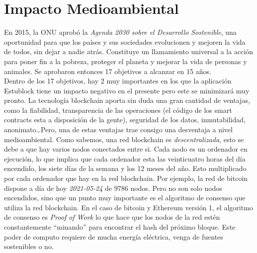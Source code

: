 \chapter{Impacto Medioambiental}
\label{cap:ImpactoMedioAmbiente}

En 2015, la ONU aprobó la \emph{Agenda 2030 sobre el Desarrollo Sostenible}\cite{agenda2030}, una oportunidad para que los países y sus sociedades evolucionen y mejoren la vida de todos, sin dejar a nadie atrás. Constituye un llamamiento universal a la acción para poner fin a la pobreza, proteger el planeta y mejorar la vida de personas y animales. Se aprobaron entonces 17 objetivos\cite{17objetivos} a alcanzar en 15 años. \\

Dentro de los 17 objetivos, hay 2 muy importantes en los que la aplicación Estublock tiene un impacto negativo en el presente pero este se minimizará muy pronto. La tecnología blockchain aporta sin duda una gran cantidad de ventajas, como la fiabilidad, transparencia de las operaciones (el código de los smart contracts esta a disposición de la gente), seguridad de los datos, inmutabilidad, anonimato\dots Pero, una de estas ventajas trae consigo una desventaja a nivel medioambiental. Como sabemos, una red blockchain es \emph{descentralizada}, esto se debe a que hay varios nodos conectados entre si. Cada nodo es un ordenador en ejecución, lo que implica que cada ordenador esta las veinticuatro horas del día encendido, los siete días de la semana y los 12 meses del año. Esto multiplicado por cada ordenador que hay en la red blockchain. Por ejemplo, la red de bitcoin dispone a día de hoy \textit{2021-05-24} de 9786 nodos\cite{bitcoinNodos}. Pero no son solo nodos encendidos, sino que un punto muy importante es el algoritmo de consenso que utiliza la red blockchain. En el caso de bitcoin y Ethereum versión 1, el algoritmo de consenso es \emph{Proof of Work} lo que hace que los nodos de la red estén constantemente ``minando'' para encontrar el hash del próximo bloque. Este poder de computo requiere de mucha energía eléctrica, venga de fuentes sostenibles o no. \\

